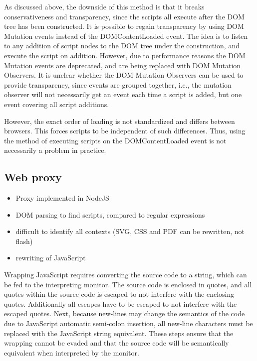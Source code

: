 \documentclass{llncs}
\begin{document}
As discussed above, the downside of this method is that it breaks
conservativeness and transparency, since the scripts all execute after the DOM
tree has been constructed. It is possible to regain transparency by using DOM
Mutation events instead of the DOMContentLoaded event.  The idea is to listen
to any addition of script nodes to the DOM tree under the construction, and
execute the script on addition.  However, due to performance reasons the DOM
Mutation events are deprecated, and are being replaced with DOM Mutation
Observers. It is unclear whether the DOM Mutation Observers can be used to
provide transparency, since events are grouped together, i.e., the mutation
observer will not necessarily get an event each time a script is added, but one
event covering all script additions.

However, the exact order of loading is not standardized and differs between
browsers. This forces scripts to be independent of such differences. Thus,
using the method of executing scripts on the DOMContentLoaded event is not
necessarily a problem in practice. 


\subsection{Web proxy}

\begin{itemize}
\item Proxy implemented in NodeJS
\item DOM parsing to find scripts, compared to regular expressions
\item difficult to identify all contexts (SVG, CSS and PDF can be rewritten, not flash)
\item rewriting of JavaScript
\end{itemize}

Wrapping JavaScript requires converting the source code to a string, which can 
be fed to the interpreting monitor. The source code is enclosed in quotes, and all 
quotes within the source code is escaped to not interfere with the enclosing quotes.
Additionally all escapes have to be escaped to not interfere with the escaped 
quotes. Next, because new-lines may change the semantics of the code due to 
JavaScript automatic semi-colon insertion, all new-line 
characters must be replaced with the JavaScript string equivalent.
These steps ensure that the wrapping cannot be evaded and that the source code 
will be semantically equivalent when interpreted by the monitor.
\end{document}
